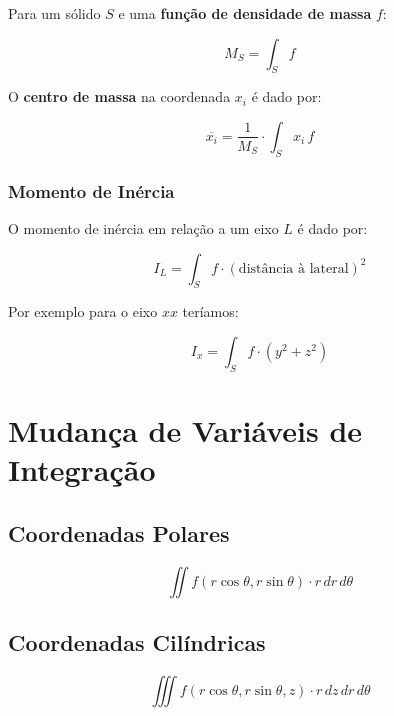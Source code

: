 \documentclass[11pt, a4paper]{article}
\begin{document}
Para um sólido $S$ e uma \textbf{função de densidade de massa} $f$:

\begin{equation*}
    M_S = \int_{S} f
\end{equation*}

O \textbf{centro de massa} na coordenada $x_i$ é dado por:

\begin{equation*}
    \overline{x_i} = \frac{1}{M_S} \cdot \int_{S} x_i \, f
\end{equation*}

\subsubsection{Momento de Inércia}

O momento de inércia em relação a um eixo $L$ é dado por:

\begin{equation*}
    I_L = \int_{S} f \cdot \left(\text{distância à lateral}\right)^2
\end{equation*}

Por exemplo para o eixo $xx$ teríamos:

\begin{equation*}
    I_x = \int_{S} f \cdot \left(y^2 + z^2\right)
\end{equation*}


\section{Mudança de Variáveis de Integração}

\subsection{Coordenadas Polares}

\begin{equation*}
    \iint f\left(r\cos\theta, r\sin\theta\right) \cdot r\,dr\,d\theta
\end{equation*}

\subsection{Coordenadas Cilíndricas}

\begin{equation*}
    \iiint f\left(r\cos\theta, r\sin\theta, z\right) \cdot r\,dz\,dr\,d\theta
\end{equation*}
\end{document}
